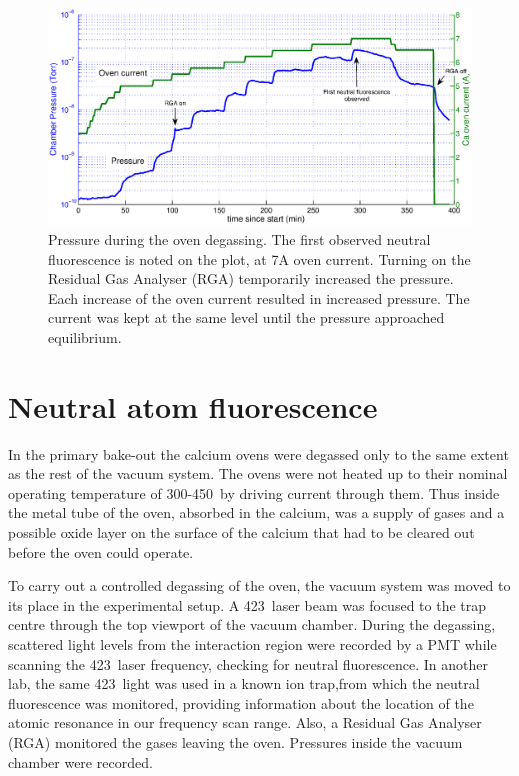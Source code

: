 \begin{figure}[t]
\centering
\includegraphics[width=14.2cm]{chapter5/ovenstart/pressure_ovencurrent_3}
\caption[Pressure during \CaI{} oven degassing]{Pressure during the \CaI{} oven degassing. The first observed neutral fluorescence is noted on the plot, at 7A oven current. Turning on the Residual Gas Analyser (RGA) temporarily increased the pressure. Each increase of the oven current resulted in increased pressure. The current was kept at the same level until the pressure approached equilibrium.}
\label{degassing_pressure}
\end{figure} 



\section{Neutral atom fluorescence}
\label{sec:atomfluo}

In the primary bake-out the calcium ovens were degassed only to the same extent as the rest of the vacuum system. The ovens were not heated up to their nominal operating temperature of 300-450\degC\, by driving current through them. Thus inside the metal tube of the oven, absorbed in the calcium, was a supply of gases and a possible oxide layer on the surface of the calcium that had to be cleared out before the oven could operate. 

To carry out a controlled degassing of the oven, the vacuum system was moved to its place in the experimental setup. A 423\nm\, laser beam was focused to the trap centre through the top viewport of the vacuum chamber. During the degassing, scattered light levels from the interaction region were recorded by a PMT while scanning the 423\nm\, laser frequency, checking for neutral \CaI{} fluorescence. In another lab, the same 423\nm\, light was used in a known ion trap,from which the neutral fluorescence was monitored, providing information about the location of the atomic resonance in our frequency scan range. Also, a Residual Gas Analyser (RGA) monitored the gases leaving the oven. Pressures inside the vacuum chamber were recorded. 

